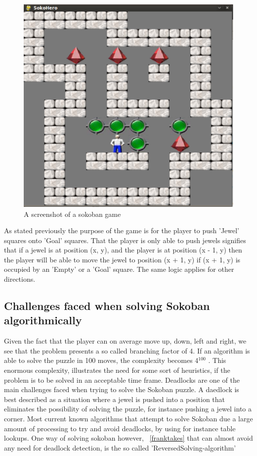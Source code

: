 \begin{figure}[here]
\centering
\includegraphics[scale=0.25]{images/sokohero.eps}
\caption{A screenshot of a sokoban game}
\label{fig:sokohero}
\end{figure}


As stated previously the purpose of the game is for the player to push 'Jewel' squares onto 'Goal' squares. That the player is only able to push jewels signifies that if a jewel is at position (x, y), and the player is at position (x - 1, y) then the player will be able to move the jewel to position (x + 1, y) if (x + 1, y) is occupied by an 'Empty' or a 'Goal' square. The same logic applies for other directions.
 
\subsection{Challenges faced when solving Sokoban algorithmically}
Given the fact that the player can on average move up, down, left and right, we see that the problem presents a so called branching factor of 4. If an algorithm is able to solve the puzzle in 100 moves, the complexity becomes 4$^{100}$ . 
This enormous complexity, illustrates the need for some sort of heuristics, if the problem is to be solved in an acceptable time frame.
Deadlocks are one of the main challenges faced when trying to solve the Sokoban puzzle. A daedlock is best described as a situation where a jewel is pushed into a position that eliminates the possibility of solving the puzzle, for instance pushing a jewel into a corner. Most current known algorithms that attempt to solve Sokoban due a large amount of processing to try and avoid deadlocks, by using for instance table lookups. One way of solving sokoban however, ~\ref{franktakes} that can almost avoid any need for deadlock detection, is the so called 'ReversedSolving-algorithm'


